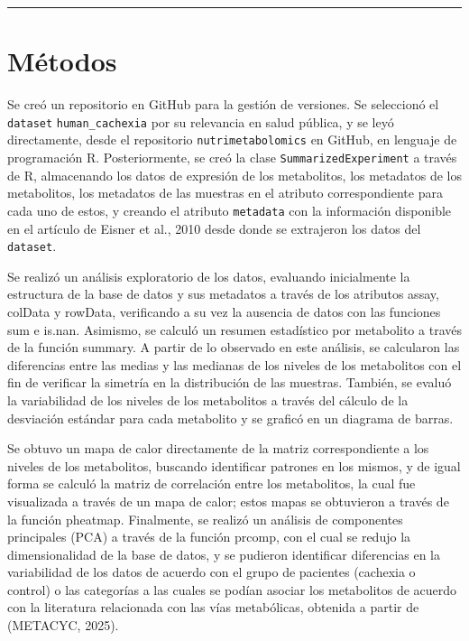 \documentclass[
]{article}
\begin{document}
\begin{center}\rule{0.5\linewidth}{0.5pt}\end{center}

\section{Métodos}\label{muxe9todos}

Se creó un repositorio en GitHub para la gestión de versiones. Se
seleccionó el \texttt{dataset} \texttt{human\_cachexia} por su
relevancia en salud pública, y se leyó directamente, desde el
repositorio \texttt{nutrimetabolomics} en GitHub, en lenguaje de
programación R. Posteriormente, se creó la clase
\texttt{SummarizedExperiment} a través de R, almacenando los datos de
expresión de los metabolitos, los metadatos de los metabolitos, los
metadatos de las muestras en el atributo correspondiente para cada uno
de estos, y creando el atributo \texttt{metadata} con la información
disponible en el artículo de Eisner et al., 2010 desde donde se
extrajeron los datos del \texttt{dataset}.

Se realizó un análisis exploratorio de los datos, evaluando inicialmente
la estructura de la base de datos y sus metadatos a través de los
atributos assay, colData y rowData, verificando a su vez la ausencia de
datos con las funciones sum e is.nan. Asimismo, se calculó un resumen
estadístico por metabolito a través de la función summary. A partir de
lo observado en este análisis, se calcularon las diferencias entre las
medias y las medianas de los niveles de los metabolitos con el fin de
verificar la simetría en la distribución de las muestras. También, se
evaluó la variabilidad de los niveles de los metabolitos a través del
cálculo de la desviación estándar para cada metabolito y se graficó en
un diagrama de barras.

Se obtuvo un mapa de calor directamente de la matriz correspondiente a
los niveles de los metabolitos, buscando identificar patrones en los
mismos, y de igual forma se calculó la matriz de correlación entre los
metabolitos, la cual fue visualizada a través de un mapa de calor; estos
mapas se obtuvieron a través de la función pheatmap. Finalmente, se
realizó un análisis de componentes principales (PCA) a través de la
función prcomp, con el cual se redujo la dimensionalidad de la base de
datos, y se pudieron identificar diferencias en la variabilidad de los
datos de acuerdo con el grupo de pacientes (cachexia o control) o las
categorías a las cuales se podían asociar los metabolitos de acuerdo con
la literatura relacionada con las vías metabólicas, obtenida a partir de
(METACYC, 2025).
\end{document}
